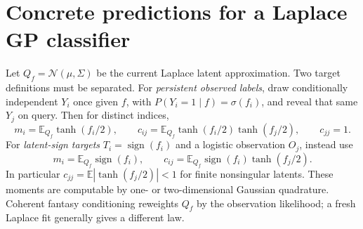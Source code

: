 \documentclass[11pt]{article}
\theoremstyle{definition}
\newcommand{\E}{\mathbb E}
\newcommand{\1}{\mathbf 1}
\begin{document}
\section{Concrete predictions for a Laplace GP classifier}
Let $Q_f=\mathcal N(\mu,\Sigma)$ be the current Laplace latent approximation.
Two target definitions must be separated. For \emph{persistent observed labels},
draw conditionally independent $Y_i$ once given $f$, with
$P(Y_i=1\mid f)=\sigma(f_i)$, and reveal that same $Y_j$ on query.
Then for distinct indices,
\[
 m_i=\E_{Q_f}\tanh(f_i/2),\qquad
 c_{ij}=\E_{Q_f}\tanh(f_i/2)\tanh(f_j/2),\qquad c_{jj}=1.
\]
For \emph{latent-sign targets} $T_i=\operatorname{sign}(f_i)$ and a logistic
observation $O_j$, instead use
\[
 m_i=\E_{Q_f}\operatorname{sign}(f_i),\qquad
 c_{ij}=\E_{Q_f}\operatorname{sign}(f_i)\tanh(f_j/2).
\]
In particular $c_{jj}=\E|\tanh(f_j/2)|<1$ for finite nonsingular latents.
These moments are computable by one- or two-dimensional Gaussian quadrature.
Coherent fantasy conditioning reweights $Q_f$ by the observation likelihood;
a fresh Laplace fit generally gives a different law.
\end{document}
